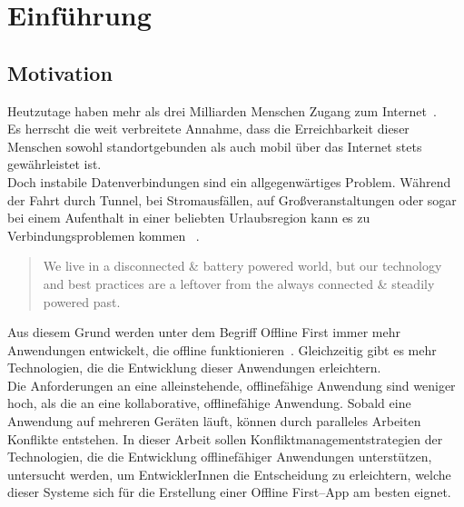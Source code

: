 \chapter{\label{chap:einleitung}Einführung}
\section{Motivation}

Heutzutage haben mehr als drei Milliarden Menschen Zugang zum Internet~\cite{dev-report}.\\
Es herrscht die weit verbreitete Annahme, dass die Erreichbarkeit dieser Menschen sowohl standortgebunden als auch mobil über das Internet stets gewährleistet ist.\\
Doch instabile Datenverbindungen sind ein allgegenwärtiges Problem. Während der Fahrt durch Tunnel, bei Stromausfällen, auf Großveranstaltungen oder sogar bei einem Aufenthalt in einer beliebten Urlaubsregion kann es zu Verbindungsproblemen kommen ~\cite{offline_ux, ndr}.\vspace{0.3cm}
\begin{quote}
	We live in a disconnected \& battery powered world, but our technology and best practices are a leftover from the always connected \& steadily powered past.
	\cite{offlinefirst}\vspace{0.3cm}
\end{quote}
%
Aus diesem Grund werden unter dem Begriff Offline First immer mehr Anwendungen entwickelt, die offline funktionieren~\cite{heise}.
Gleichzeitig gibt es mehr Technologien, die die Entwicklung dieser Anwendungen erleichtern.\\
%
%
Die Anforderungen an eine alleinstehende, offlinefähige Anwendung sind weniger hoch, als die an eine kollaborative, offlinefähige Anwendung.
Sobald eine Anwendung auf mehreren Geräten läuft, können durch paralleles Arbeiten Konflikte entstehen.
In dieser Arbeit sollen Konfliktmanagementstrategien der Technologien, die die Entwicklung offlinefähiger Anwendungen unterstützen, untersucht werden, 
um EntwicklerInnen die Entscheidung zu erleichtern, welche dieser Systeme sich für die Erstellung einer Offline First--\gls{App} am besten eignet.
%
%
\clearpage
